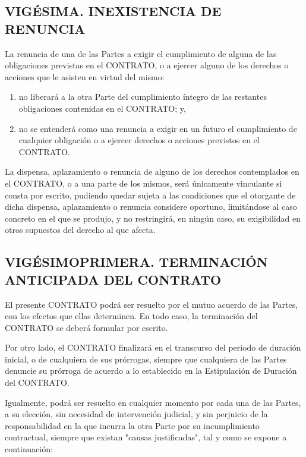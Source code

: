 \documentclass[a4paper,11pt]{report}
\begin{document}
	\subsection*{VIGÉSIMA. INEXISTENCIA DE RENUNCIA}

	La renuncia de una de las Partes a exigir el cumplimiento de alguna de
	las obligaciones previstas en el CONTRATO, o a ejercer alguno de los
	derechos o acciones que le asisten en virtud del mismo:
		\begin{enumerate}[label=\Alph*)]
			\item no liberará a la otra Parte del cumplimiento íntegro de las
			restantes obligaciones contenidas en el CONTRATO; y,

			\item no se entenderá como una renuncia a
			exigir en un futuro el cumplimiento de cualquier obligación o a ejercer
			derechos o acciones previstos en el CONTRATO.
		\end{enumerate}

	La dispensa, aplazamiento o renuncia de alguno de los derechos
	contemplados en el CONTRATO, o a una parte de los mismos, será
	únicamente vinculante si consta por escrito, pudiendo quedar sujeta a
	las condiciones que el otorgante de dicha dispensa, aplazamiento o
	renuncia considere oportuno, limitándose al caso concreto en el que se
	produjo, y no restringirá, en ningún caso, su exigibilidad en otros
	supuestos del derecho al que afecta.

	\subsection*{VIGÉSIMOPRIMERA. TERMINACIÓN ANTICIPADA DEL CONTRATO}

	El presente CONTRATO podrá ser resuelto por el mutuo acuerdo de las
	Partes, con los efectos que ellas determinen. En todo caso, la
	terminación del CONTRATO se deberá formular por escrito.

	Por otro lado, el CONTRATO finalizará en el transcurso del periodo de
	duración inicial, o de cualquiera de sus prórrogas, siempre que
	cualquiera de las Partes denuncie su prórroga de acuerdo a lo
	establecido en la Estipulación de Duración del CONTRATO.

	Igualmente, podrá ser resuelto en cualquier momento por cada una de las
	Partes, a su elección, sin necesidad de intervención judicial, y sin
	perjuicio de la responsabilidad en la que incurra la otra Parte por su
	incumplimiento contractual, siempre que existan "causas justificadas",
	tal y como se expone a continuación:
\end{document}
